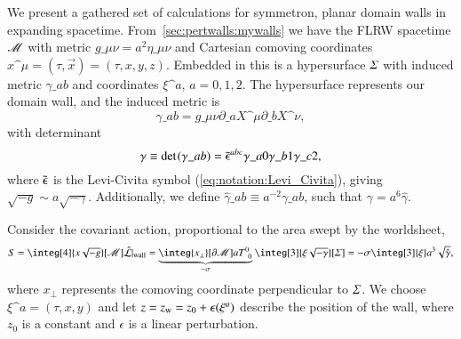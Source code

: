 





\newcommand\hypsurf{\ALIAShypsurf}
\newcommand\pert{\ALIASpert}
\newcommand\sppt{\ALIASsppt}







We present a gathered set of calculations for symmetron, planar domain walls in expanding spacetime. From~\cref{sec:pertwalls:mywalls} we have the FLRW spacetime $\mathscr{M}$ with metric $g\_{\mu\nu}=a^2 \eta\_{\mu\nu}$ and Cartesian comoving coordinates $x\^\mu = (\tau, \vec{x})=(\tau, x,y,z)$. Embedded in this is a hypersurface $\hypsurf$ with induced metric $\gamma\_{ab}$ and coordinates $\xi\^a$, $a=0,1,2$. %
The hypersurface represents our domain wall, and the induced metric is
\begin{equation}
    \gamma\_{ab} = g\_{\mu\nu} \partial\_{a} X\^\mu \partial\_{b} X\^\nu,
\end{equation}
with determinant
\begin{equation}
    \gamma \equiv \det~\!(\gamma\_{ab}) = \tilde{\epsilonup}\^{abc}\gamma\_{a0}\gamma\_{b1}\gamma\_{c2},
\end{equation}
where $\tilde{\epsilonup}$ is the Levi-Civita symbol (\cref{eq:notation:Levi_Civita}), 
giving $\sqrt{-g}\sim a\sqrt{-\gamma}$. Additionally, we define $\hat{\gamma}\_{ab} \equiv a^{-2}\gamma\_{ab}$, such that $\gamma =a^6 \hat{\gamma}$.


Consider the covariant action, proportional to the area swept by the worldsheet,
\begin{equation}\label{eq:walls:covariant_action}
    S = \integ[4]{x\sqrt{-g}}[\Manifold] \hat{\mathcal{L}}\rvert\ped{wall} = \underbrace{\integ{x_\bot}[\partial \Manifold] aT\iud{0}{0}}_{-\sigma} \integ[3]{\xi \sqrt{-\gamma}}[\hypsurf] = -\sigma \integ[3]{\xi}a^3 \sqrt{\hat{\gamma}},
\end{equation}
where $x_\bot$ represents the comoving coordinate perpendicular to $\hypsurf$. %
We choose $\xi\^a = (\tau, x, y)$ and let $z=z\ped{w}=z_0 + \epsilon(\xi\^a)$ describe the position of the wall, where $z_0$ is a constant and $\epsilon$ is a linear perturbation. 

